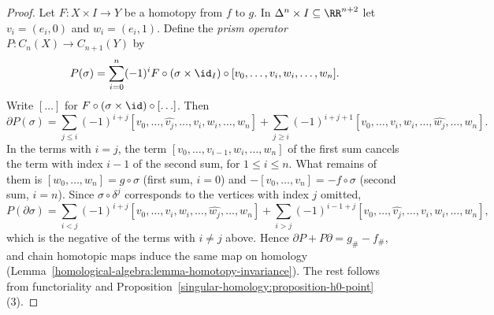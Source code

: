 \begin{proof}
Let $F \colon X \times I \to Y$ be a homotopy from $f$ to $g$. In $\Delta^n \times I \subseteq \RR^{n+2}$ let $v_i = (e_i, 0)$ and $w_i = (e_i, 1)$. Define the
\emph{prism operator} $P \colon C_n(X) \to C_{n+1}(Y)$ by
\[
P(\sigma) = \sum_{i=0}^n (-1)^i F \circ (\sigma \times \id_I) \circ [v_0, \ldots, v_i, w_i, \ldots, w_n].
\]
Write $[\ldots]$ for $F \circ (\sigma \times \id) \circ [\ldots]$. Then
\[
\partial P(\sigma) = \sum_{j \leq i}(-1)^{i+j}[v_0, \ldots, \widehat{v_j}, \ldots, v_i, w_i, \ldots, w_n]
+ \sum_{j \geq i}(-1)^{i+j+1}[v_0, \ldots, v_i, w_i, \ldots, \widehat{w_j}, \ldots, w_n].
\]
In the terms with $i = j$, the term $[v_0, \ldots, v_{i-1}, w_i, \ldots, w_n]$ of the first sum cancels the term with index $i - 1$ of the second sum, for
$1 \leq i \leq n$. What remains of them is $[w_0, \ldots, w_n] = g \circ \sigma$ (first sum, $i = 0$) and $-[v_0, \ldots, v_n] = -f \circ \sigma$ (second sum,
$i = n$). Since $\sigma \circ \delta^j$ corresponds to the vertices with index $j$ omitted,
\[
P(\partial\sigma) = \sum_{i < j}(-1)^{i+j}[v_0, \ldots, v_i, w_i, \ldots, \widehat{w_j}, \ldots, w_n] + \sum_{i > j}(-1)^{i-1+j}[v_0, \ldots, \widehat{v_j}, \ldots, v_i, w_i, \ldots, w_n],
\]
which is the negative of the terms with $i \neq j$ above. Hence $\partial P + P\partial = g_\# - f_\#$, and chain homotopic maps induce the same map on homology
(Lemma~\ref{homological-algebra:lemma-homotopy-invariance}). The rest follows from functoriality and Proposition~\ref{singular-homology:proposition-h0-point}(3).
\end{proof}

